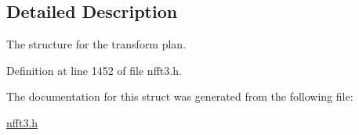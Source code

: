 \subsection{Detailed Description}
The structure for the transform plan. 

Definition at line 1452 of file nfft3.h.

The documentation for this struct was generated from the following file:\begin{CompactItemize}
\item 
\hyperlink{nfft3_8h}{nfft3.h}\end{CompactItemize}

